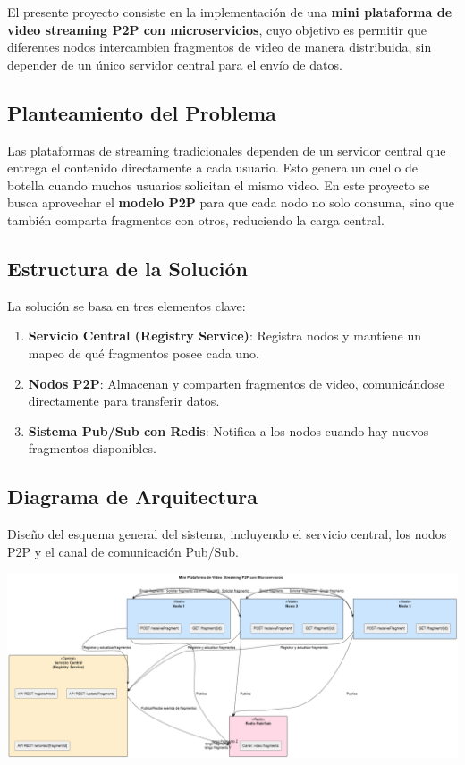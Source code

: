
El presente proyecto consiste en la implementación de una \textbf{mini plataforma de video streaming P2P con microservicios}, cuyo objetivo es permitir que diferentes nodos intercambien fragmentos de video de manera distribuida, sin depender de un único servidor central para el envío de datos.

\subsection*{Planteamiento del Problema}
Las plataformas de streaming tradicionales dependen de un servidor central que entrega el contenido directamente a cada usuario. Esto genera un cuello de botella cuando muchos usuarios solicitan el mismo video.  
En este proyecto se busca aprovechar el \textbf{modelo P2P} para que cada nodo no solo consuma, sino que también comparta fragmentos con otros, reduciendo la carga central.

\subsection*{Estructura de la Solución}
La solución se basa en tres elementos clave:
\begin{enumerate}
    \item \textbf{Servicio Central (Registry Service)}: Registra nodos y mantiene un mapeo de qué fragmentos posee cada uno.
    \item \textbf{Nodos P2P}: Almacenan y comparten fragmentos de video, comunicándose directamente para transferir datos.
    \item \textbf{Sistema Pub/Sub con Redis}: Notifica a los nodos cuando hay nuevos fragmentos disponibles.
\end{enumerate}

\subsection*{Diagrama de Arquitectura}
Diseño del esquema general del sistema, incluyendo el servicio central, los nodos P2P y el canal de comunicación Pub/Sub.

\begin{center}
    \includegraphics[width=\textwidth]{Diagramas/Diagrama.png}
\end{center}
